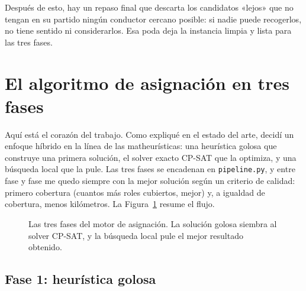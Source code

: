 \documentclass[11pt,a4paper,spanish]{book}
\numberwithin{equation}{chapter}
\numberwithin{figure}{chapter}
\numberwithin{table}{chapter}
\newcommand{\fuente}[1]{\par\vspace{2pt}{\footnotesize\textit{Fuente: #1}}}
\begin{document}
Después de esto, hay un repaso final que descarta los candidatos «lejos» que no tengan en su partido ningún conductor cercano posible: si nadie puede recogerlos, no tiene sentido ni considerarlos. Esa poda deja la instancia limpia y lista para las tres fases.

\section{El algoritmo de asignación en tres fases}
\label{sec:algoritmo}

Aquí está el corazón del trabajo. Como expliqué en el estado del arte, decidí un enfoque híbrido en la línea de las matheurísticas: una heurística golosa que construye una primera solución, el solver exacto CP-SAT que la optimiza, y una búsqueda local que la pule. Las tres fases se encadenan en \texttt{pipeline.py}, y entre fase y fase me quedo siempre con la mejor solución según un criterio de calidad: primero cobertura (cuantos más roles cubiertos, mejor) y, a igualdad de cobertura, menos kilómetros. La Figura~\ref{fig:fases} resume el flujo.

\begin{figure}[ht]
\centering
{}
\caption{Las tres fases del motor de asignación. La solución golosa siembra al solver CP-SAT, y la búsqueda local pule el mejor resultado obtenido.}
\label{fig:fases}
\fuente{elaboración propia.}
\end{figure}

\subsection{Fase 1: heurística golosa}
\end{document}
